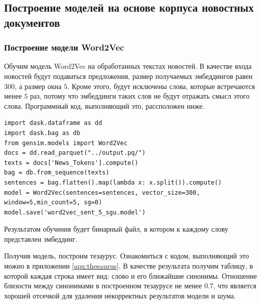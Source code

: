 \documentclass[coursework]{SCWorks}
\begin{document}
\subsection{Построение моделей на основе корпуса новостных документов}
\subsubsection{Построение модели Word2Vec}
\label{section:word2vec-construction}
Обучим модель Word2Vec на обработанных текстах новостей. В качестве входа новостей будут подаваться предложения, размер получаемых эмбеддингов равен $300$, а размер окна $5$. Кроме этого, будут исключены слова, которые встречаются менее $5$ раз, потому что эмбеддинги таких слов не будут отражать смысл этого слова. Программный код, выполняющий это, рассположен ниже.
\begin{verbatim}
import dask.dataframe as dd
import dask.bag as db
from gensim.models import Word2Vec
docs = dd.read_parquet("../output.pq/")
texts = docs['News_Tokens'].compute()
bag = db.from_sequence(texts)
sentences = bag.flatten().map(lambda x: x.split()).compute()
model = Word2Vec(sentences=sentences, vector_size=300, window=5,min_count=5, sg=0)
model.save('word2vec_sent_5_sgu.model')
\end{verbatim}

Результатом обучения будет бинарный файл, в котором к каждому слову представлен эмбеддинг.

Получив модель, построим тезаурус. Ознакомиться с кодом, выполняющий это можно в приложении \ref{apx:thesaurus}. В качестве результата получим таблицу, в которой каждая строка имеет вид: слово и его ближайшие синонимы. Отношение близости между синонимами в построенном тезаурусе не менее $0.7$, что является хорошей отсечкой для удаления некорректных результатов модели и шума.
\end{document}
